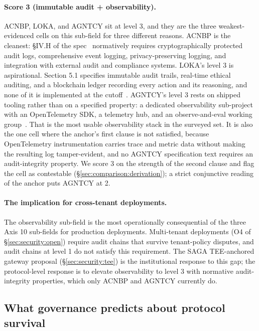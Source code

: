 \paragraph{Score 3 (immutable audit + observability).}
ACNBP, LOKA, and AGNTCY sit at level 3, and they are the
three weakest-evidenced cells on this sub-field for three
different reasons. ACNBP is the cleanest: \S IV.H of the
spec~\cite{spec_acnbp} normatively requires
cryptographically protected audit logs, comprehensive
event logging, privacy-preserving logging, and
integration with external audit and compliance systems.
LOKA's level 3 is aspirational. Section 5.1 specifies
immutable audit trails, real-time ethical auditing, and
a blockchain ledger recording every action and its
reasoning, and none of it is implemented at the
cutoff~\cite{spec_loka}. AGNTCY's level 3 rests on
shipped tooling rather than on a specified property: a
dedicated observability sub-project with an
OpenTelemetry SDK, a telemetry hub, and an
observe-and-eval working group~\cite{spec_agntcy}. That
is the most usable observability stack in the surveyed
set. It is also the one cell where the anchor's first
clause is not satisfied, because OpenTelemetry
instrumentation carries trace and metric data without
making the resulting log tamper-evident, and no AGNTCY
specification text requires an audit-integrity property.
We score 3 on the strength of the second clause and flag
the cell as contestable
(\S\ref{sec:comparison:derivation}); a strict conjunctive
reading of the anchor puts AGNTCY at 2.

\paragraph{The implication for cross-tenant deployments.}
The observability sub-field is the most operationally
consequential of the three Axis 10 sub-fields for
production deployments. Multi-tenant deployments
(O4 of \S\ref{sec:security:open}) require audit
chains that survive tenant-policy disputes, and
audit chains at level 1 do not satisfy this
requirement. The SAGA TEE-anchored gateway proposal
(\S\ref{sec:security:tee}) is the institutional
response to this gap; the protocol-level response is
to elevate observability to level 3 with normative
audit-integrity properties, which only ACNBP and
AGNTCY currently do.

\subsection{What governance predicts about protocol survival}
\label{sec:governance:survival}

